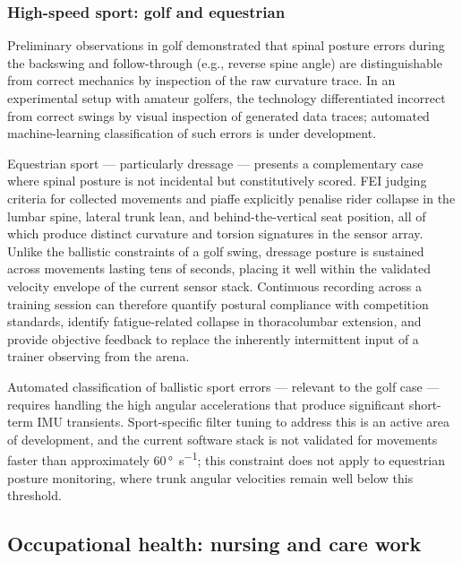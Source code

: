 \subsubsection{High-speed sport: golf and equestrian}

Preliminary observations in golf demonstrated that spinal posture errors during the
backswing and follow-through (e.g., reverse spine angle) are distinguishable from
correct mechanics by inspection of the raw curvature trace.
In an experimental setup with amateur golfers, the technology differentiated incorrect
from correct swings by visual inspection of generated data traces; automated
machine-learning classification of such errors is under development.

Equestrian sport --- particularly dressage --- presents a complementary case where
spinal posture is not incidental but constitutively scored.
FEI judging criteria for collected movements and piaffe explicitly penalise rider
collapse in the lumbar spine, lateral trunk lean, and behind-the-vertical seat
position, all of which produce distinct curvature and torsion signatures in the
sensor array.
Unlike the ballistic constraints of a golf swing, dressage posture is sustained
across movements lasting tens of seconds, placing it well within the validated
velocity envelope of the current sensor stack.
Continuous recording across a training session can therefore quantify postural
compliance with competition standards, identify fatigue-related collapse in
thoracolumbar extension, and provide objective feedback to replace the
inherently intermittent input of a trainer observing from the arena.

Automated classification of ballistic sport errors --- relevant to the golf case ---
requires handling the high angular
accelerations that produce significant short-term \acs{IMU} transients.
Sport-specific filter tuning to address this is an active area of development, and the
current software stack is not validated for movements faster than approximately
60\,\si{\degree\per\second}; this constraint does not apply to equestrian posture
monitoring, where trunk angular velocities remain well below this threshold.

\subsection{Occupational health: nursing and care work}

